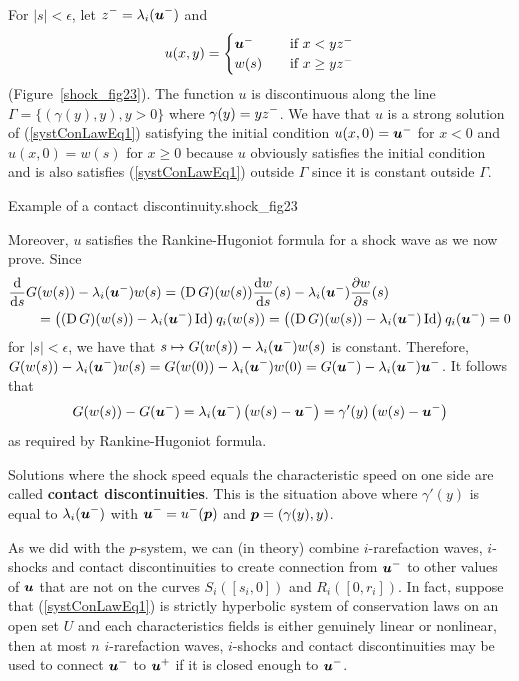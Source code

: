 For $|s| < \epsilon$, let $\DS z^- = \lambda_i(\VEC{u}^-)$ and
\[
u(x,y) = \begin{cases} \VEC{u}^- & \quad \text{if} \ x < y z^- \\
w(s) & \quad \text{if} \ x \geq y z^-
\end{cases}
\]
(Figure~\ref{shock_fig23}).
The function $u$ is discontinuous along the line
$\Gamma = \{ (\gamma(y),y), y >0\}$ where
$\DS \gamma(y) = y z^-$.
We have that $u$ is a strong solution of (\ref{systConLawEq1})
satisfying the initial condition
$u(x,0) = \VEC{u}^-$ for $x<0$ and $u(x,0) = w(s)$ for $x \geq 0$
because $u$ obviously satisfies the initial condition and is also satisfies
(\ref{systConLawEq1}) outside $\Gamma$ since it is constant outside
$\Gamma$.

{Example of a contact discontinuity.}{shock_fig23}

Moreover, $u$ satisfies the Rankine-Hugoniot formula for a shock
wave as we now prove.  Since
\begin{align*}
&\dfdx{G(w(s)) - \lambda_i(\VEC{u}^-) w(s)}{s}
= (\diff G)(w(s)) \dydx{w}{s}(s) - \lambda_i(\VEC{u}^-) \pdydx{w}{s}(s) \\
&\qquad = \left( (\diff G)(w(s)) - \lambda_i(\VEC{u}^-) \Id \right) q_i(w(s))
= \left( (\diff G)(w(s)) - \lambda_i(\VEC{u}^-) \Id \right) q_i(\VEC{u}^-)
= 0
\end{align*}
for $|s|<\epsilon$, we have that
$\DS s \mapsto G(w(s)) - \lambda_i(\VEC{u}^-) w(s)$
is constant.  Therefore,
$\DS G(w(s)) - \lambda_i(\VEC{u}^-) w(s)
=  G(w(0)) - \lambda_i(\VEC{u}^-) w(0)
= G(\VEC{u}^-) - \lambda_i(\VEC{u}^-) \VEC{u}^-$.  It follows that
\[
G(w(s)) - G(\VEC{u}^-)
= \lambda_i(\VEC{u}^-) \left( w(s) - \VEC{u}^-\right)
= \gamma'(y) \left( w(s) - \VEC{u}^-\right)
\]
as required by Rankine-Hugoniot formula.

Solutions where the shock speed equals the characteristic speed on one
side are called {\bfseries contact discontinuities}.  This is the situation above where
$\gamma'(y)$  is equal to $\DS \lambda_i(\VEC{u}^-)$ with
$\DS \VEC{u}^- = u^-(\VEC{p})$ and $\VEC{p} = (\gamma(y),y)$.

As we did with the $p$-system, we can (in theory) combine
$i$-rarefaction waves, $i$-shocks and contact discontinuities to
create connection from $\DS \VEC{u}^-$ to other values of
$\VEC{u}$ that are not on the curves $S_i([s_i,0])$ and $R_i([0,r_i])$.
In fact, suppose that (\ref{systConLawEq1}) is strictly hyperbolic
system of conservation laws on an open set $U$ and each characteristics
fields is either genuinely linear or nonlinear, then at most
$n$ $i$-rarefaction waves, $i$-shocks and contact discontinuities
may be used to connect $\DS \VEC{u}^-$ to 
$\DS \VEC{u}^+$ if it is closed enough to $\DS \VEC{u}^-$.

